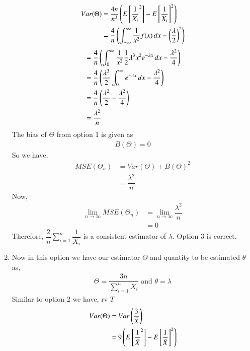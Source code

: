 \begin{enumerate}
    \begin{align}
     Var(\Theta)   & = \dfrac{4n}{n^2} \left(E  \left[ {\dfrac{1}{X_i}}^2  \right] - {E  \left[ {\dfrac{1}{X_i}}  \right]}^2 \right) \\
        & = \dfrac{4}{n} \left( \int_{-\infty}^{\infty} \dfrac{1}{x^2} f(x)\,dx  - \left(\dfrac{\lambda}{2}\right)^2 \right) 
     \end{align}
     \begin{align}
        & =  \dfrac{4}{n} \left( \int_{0}^{\infty} \dfrac{1}{x^2}  \dfrac{1}{2} \lambda^3x^2e^{-\lambda x} \,dx  - {\dfrac{\lambda^2}{4}} \right) \\
          & =  \dfrac{4}{n} \left( \dfrac{\lambda^3}{2}\int_{0}^{\infty} e^{-\lambda x} \,dx  - {\dfrac{\lambda^2}{4}} \right) \\ 
        & =  \dfrac{4}{n} \left( {\dfrac{\lambda^2}{2}} - {\dfrac{\lambda^2}{4}} \right) \\ 
        &= \dfrac{\lambda^2}{n}
    \end{align}
    The bias of $ \Theta $ from option 1 is given as
    \begin{align}
        B(\Theta) = 0
    \end{align}
    So we have,
    \begin{align}
        MSE(\Theta_n) &= Var(\Theta) + B(\Theta)^2 \\
        &= \dfrac{\lambda^2}{n}
    \end{align}
    Now,
    \begin{align}
         \lim_{n\to\infty} MSE( \Theta_n) &=    \lim_{n\to\infty} \dfrac{\lambda^2}{n} \\
          &= 0
    \end{align}
    Therefore, $\dfrac{2}{n} \sum_{i=1}^{n} \dfrac{1}{X_i} $ is a consistent estimator of $ \lambda$. 
    Option 3 is correct. \\
    \item 
     Now in this option we have our estimator $ \Theta$ and quantity to be estimated $ \theta $ as,
     \begin{align}
         \Theta = \dfrac{3n}{\sum_{i=1}^{n} X_i } \text{  and  }
         \theta = \lambda
     \end{align}
     Similar to option 2 we have, rv $ T$
     \begin{align}
         Var(\Theta)&= Var\left(\dfrac{3}{\Bar{X}}\right) \\
         &= 9 \left( E \left[   {\dfrac{1}{\Bar{X}}}^2  \right] - { E \left[   \dfrac{1}{\Bar{X}}  \right]}^2\right)
     \end{align}

\end{enumerate}
